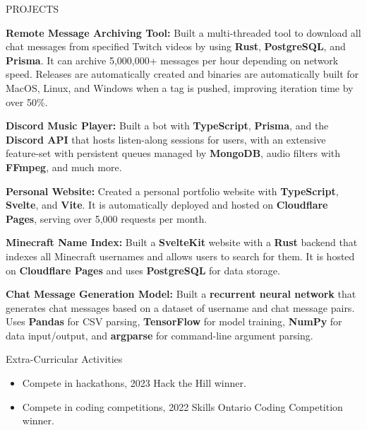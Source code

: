 \documentclass{resume}
\begin{document}
\begin{rSection}{PROJECTS}
	\vspace{-1.25em}

	\item \textbf{Remote Message Archiving Tool:} {Built a multi-threaded tool to download all chat messages from specified Twitch videos by using \textbf{Rust}, \textbf{PostgreSQL}, and \textbf{Prisma}. It can archive 5,000,000+ messages per hour depending on network speed. Releases are automatically created and binaries are automatically built for MacOS, Linux, and Windows when a tag is pushed, improving iteration time by over 50\%.}

	\item \textbf{Discord Music Player:} {Built a bot with \textbf{TypeScript}, \textbf{Prisma}, and the \textbf{Discord API} that hosts listen-along sessions for users, with an extensive feature-set with persistent queues managed by \textbf{MongoDB}, audio filters with \textbf{FFmpeg}, and much more.}

	\item \textbf{Personal Website:} {Created a personal portfolio website with \textbf{TypeScript}, \textbf{Svelte}, and \textbf{Vite}. It is automatically deployed and hosted on \textbf{Cloudflare Pages}, serving over 5,000 requests per month.}

	\item \textbf{Minecraft Name Index:} {Built a \textbf{SvelteKit} website with a \textbf{Rust} backend that indexes all Minecraft usernames and allows users to search for them. It is hosted on \textbf{Cloudflare Pages} and uses \textbf{PostgreSQL} for data storage.}

	\item \textbf{Chat Message Generation Model:} {Built a \textbf{recurrent neural network} that generates chat messages based on a dataset of username and chat message pairs. Uses \textbf{Pandas} for CSV parsing, \textbf{TensorFlow} for model training, \textbf{NumPy} for data input/output, and \textbf{argparse} for command-line argument parsing.}

\end{rSection}

\begin{rSection}{Extra-Curricular Activities}
	\begin{itemize}
		\item	Compete in hackathons, 2023 Hack the Hill winner.
		\item	Compete in coding competitions, 2022 Skills Ontario Coding Competition winner.
	\end{itemize}
\end{rSection}
\end{document}
